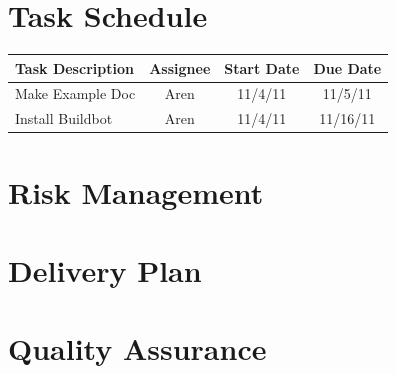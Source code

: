 \documentclass[12pt, letterpaper]{article}
\begin{document}
\section{Task Schedule}

\begin{center}
  \begin{tabular}{l || c | c | c | }
    Task Description & Assignee & Start Date & Due Date \\
    \hline
    Make Example Doc & Aren & 11/4/11 & 11/5/11 \\
    Install Buildbot & Aren & 11/4/11 & 11/16/11 \\
    \hline
  \end{tabular}
\end{center}

\section{Risk Management}

\section{Delivery Plan}

\section{Quality Assurance}
\end{document}
